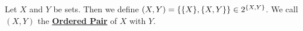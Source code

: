 \newcommand{\OrderedPair}[0]{
    \textbf{\hyperref[def:OrderedPair]{Ordered Pair}}
}
\newcommand{\OrderedPairs}[0]{
    \textbf{\hyperref[def:OrderedPair]{Ordered Pairs}}
}\begin{df}
\label{def:OrderedPair}

\rm
    Let $X$ and $Y$ be sets. 
    Then we define 
    $(X,Y)= \{\{X\}, \{X, Y\}\} \in 2^{\{X, Y\}}$. 
    We call $(X,Y)$ the \OrderedPair of $X$ with $Y$. 
\end{df}
